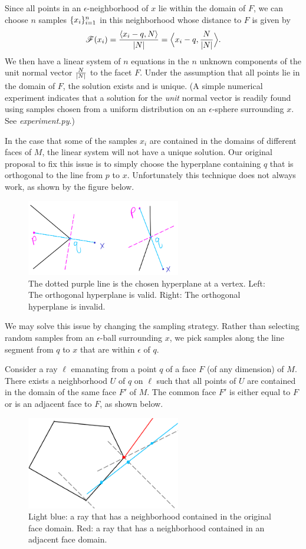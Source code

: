 \documentclass[12pt]{article}
\begin{document}
\begin{flushleft}
Since all points in an $\epsilon$-neighborhood of $x$ lie within the domain of $F$, we can choose $n$ samples $\{x_i\}_{i=1}^n$ in this neighborhood whose distance to $F$ is given by 
\[\mathscr{F}(x_i) = \frac{\langle x_i-q,N\rangle}{\lvert N\rvert}=\Big\langle x_i-q,\frac{N}{\lvert N\rvert}\Big\rangle.\]
We then have a linear system of $n$ equations in the $n$ unknown components of the unit normal vector $\frac{N}{\lvert N\rvert}$ to the facet $F$.
Under the assumption that all points lie in the domain of $F$, the solution exists and is unique.
(A simple numerical experiment indicates that a solution for the \textit{unit} normal vector is readily found using samples chosen from a uniform distribution on an $\epsilon$-sphere surrounding $x$.
See \textit{experiment.py}.)

In the case that some of the samples $x_i$ are contained in the domains of different faces of $M$, the linear system will not have a unique solution.
Our original proposal to fix this issue is to simply choose the hyperplane containing $q$ that is orthogonal to the line from $p$ to $x$.
Unfortunately this technique does not always work, as shown by the figure below.
\begin{figure}[H]
	\centering
	\includegraphics[width=0.6\textwidth]{vertex_issue.png}
	\caption{The dotted purple line is the chosen hyperplane at a vertex.
		Left: The orthogonal hyperplane is valid.
		Right: The orthogonal hyperplane is invalid.}
\end{figure}
We may solve this issue by changing the sampling strategy.
Rather than selecting random samples from an $\epsilon$-ball surrounding $x$, we pick samples along the line segment from $q$ to $x$ that are within $\epsilon$ of $q$.

Consider a ray $\ell$ emanating from a point $q$ of a face $F$ (of any dimension) of $M$.
There exists a neighborhood $U$ of $q$ on $\ell$ such that all points of $U$ are contained in the domain of the same face $F'$ of $M$.
The common face $F'$ is either equal to $F$ or is an adjacent face to $F$, as shown below.
\begin{figure}[H]
	\centering
	\includegraphics[width=0.6\textwidth]{ray_domain.png}
	\caption{Light blue: a ray that has a neighborhood contained in the original face domain.
	Red: a ray that has a neighborhood contained in an adjacent face domain.}
\end{figure}


\end{flushleft}
\end{document}

